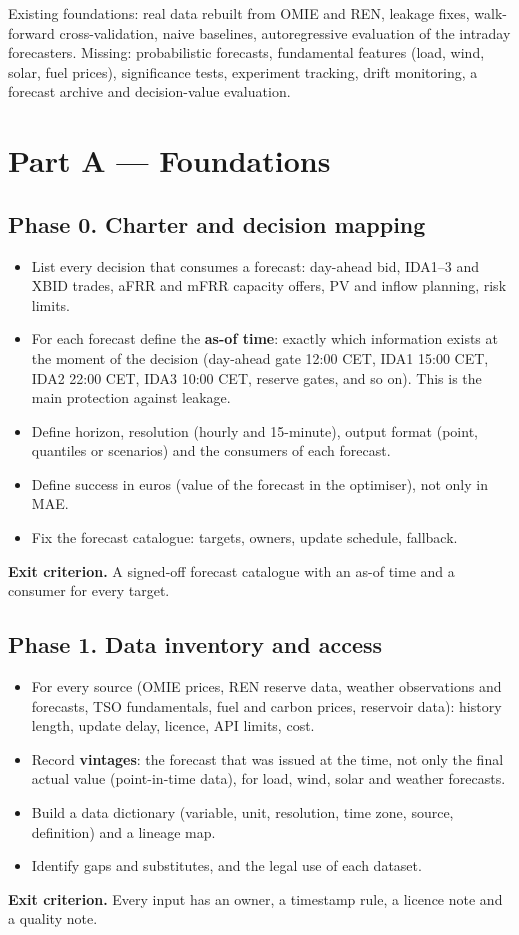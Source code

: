 \documentclass[11pt,a4paper]{article}
\newcommand{\exitcrit}[1]{\par\smallskip\noindent\colorbox{soft}{\parbox{\dimexpr\linewidth-2\fboxsep}{\textbf{Exit criterion.} #1}}\par}
\begin{document}
Existing foundations: real data rebuilt from OMIE and REN, leakage fixes, walk-forward cross-validation,
naive baselines, autoregressive evaluation of the intraday forecasters. Missing: probabilistic
forecasts, fundamental features (load, wind, solar, fuel prices), significance tests, experiment
tracking, drift monitoring, a forecast archive and decision-value evaluation.

\section{Part A --- Foundations}

\subsection{Phase 0. Charter and decision mapping}
\begin{itemize}
\item List every decision that consumes a forecast: day-ahead bid, IDA1--3 and XBID trades, aFRR and mFRR
  capacity offers, PV and inflow planning, risk limits.
\item For each forecast define the \textbf{as-of time}: exactly which information exists at the moment of the
  decision (day-ahead gate 12:00 CET, IDA1 15:00 CET, IDA2 22:00 CET, IDA3 10:00 CET, reserve gates, and so on).
  This is the main protection against leakage.
\item Define horizon, resolution (hourly and 15-minute), output format (point, quantiles or scenarios) and the
  consumers of each forecast.
\item Define success in euros (value of the forecast in the optimiser), not only in MAE.
\item Fix the forecast catalogue: targets, owners, update schedule, fallback.
\end{itemize}
\exitcrit{A signed-off forecast catalogue with an as-of time and a consumer for every target.}

\subsection{Phase 1. Data inventory and access}
\begin{itemize}
\item For every source (OMIE prices, REN reserve data, weather observations and forecasts, TSO fundamentals,
  fuel and carbon prices, reservoir data): history length, update delay, licence, API limits, cost.
\item Record \textbf{vintages}: the forecast that was issued at the time, not only the final actual value
  (point-in-time data), for load, wind, solar and weather forecasts.
\item Build a data dictionary (variable, unit, resolution, time zone, source, definition) and a lineage map.
\item Identify gaps and substitutes, and the legal use of each dataset.
\end{itemize}
\exitcrit{Every input has an owner, a timestamp rule, a licence note and a quality note.}
\end{document}

